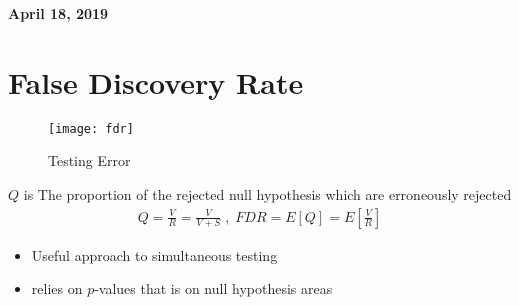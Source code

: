 \documentclass[11pt]{article}
\begin{document}
%

\newcommand{\Ito}{$It\hat{o}$'$s~Lemma$}

\newcommand\ind{\stackrel{\rm ind}{\sim}}
\newcommand\iid{\stackrel{\rm iid}{\sim}}
\renewcommand\c{\mathbf{c}}
\newcommand\y{\mathbf{y}}
\newcommand\z{\mathbf{z}}
\renewcommand\P{\mathbf{P}}
\newcommand\W{\mathbf{W}}
\newcommand\X{\mathbf{X}}
\newcommand\Y{\mathbf{Y}}
\newcommand\Z{\mathbf{Z}}
\newcommand\J{{\cal J}}
\newcommand\B{{\cal B}}
\newcommand\K{{\cal K}}
\newcommand\N{{\rm N}}
\newcommand\bs{\boldsymbol}
\newcommand\bth{\bs\theta}
\newcommand\bbe{\bs\beta}
\renewcommand\*{^\star}

\def\spacingset#1{\renewcommand{\baselinestretch}%
{#1}\small\normalsize} \spacingset{1}



  \bigskip
  \bigskip
  \bigskip
  \begin{center}
    {\LARGE\bf April 18, 2019 }
  \end{center}
  \medskip



\spacingset{1.45}


\section{False Discovery Rate}
\begin{figure}[h]
	\centering
	\texttt{[image: fdr]}
	\caption{Testing Error}
	\label{fig:fdr}
\end{figure}
$Q$ is The proportion of the rejected null hypothesis which are erroneously rejected
\begin{align*}
Q = \frac{V}{R} = \frac{V}{V+S} \;, \; FDR = E[Q] = E[\frac{V}{R}]
\end{align*}
\begin{itemize}
	\item Useful approach to simultaneous testing
	\item relies on $p$-values that is on null hypothesis areas
\end{itemize}
\end{document}
